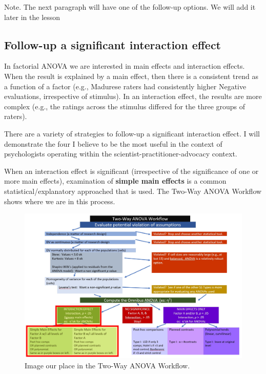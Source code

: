 \documentclass[
  11pt,
]{book}
\begin{document}
Note. The next paragraph will have one of the follow-up options. We will add it later in the lesson

\hypertarget{follow-up-a-significant-interaction-effect}{%
\subsection{Follow-up a significant interaction effect}\label{follow-up-a-significant-interaction-effect}}

In factorial ANOVA we are interested in main effects and interaction effects. When the result is explained by a main effect, then there is a consistent trend as a function of a factor (e.g., Madurese raters had consistently higher Negative evaluations, irrespective of stimulus). In an interaction effect, the results are more complex (e.g., the ratings across the stimulus differed for the three groups of raters).

There are a variety of strategies to follow-up a significant interaction effect. I will demonstrate the four I believe to be the most useful in the context of psychologists operating within the scientist-practitioner-advocacy context.

When an interaction effect is significant (irrespective of the significance of one or more main effects), examination of \textbf{simple main effects} is a common statistical/explanatory approached that is used. The Two-Way ANOVA Workflow shows where we are in this process.

\begin{figure}
\centering
\includegraphics{images/factorial/WrkFlo_IntSmp.jpg}
\caption{Image our place in the Two-Way ANOVA Workflow.}
\end{figure}
\end{document}

